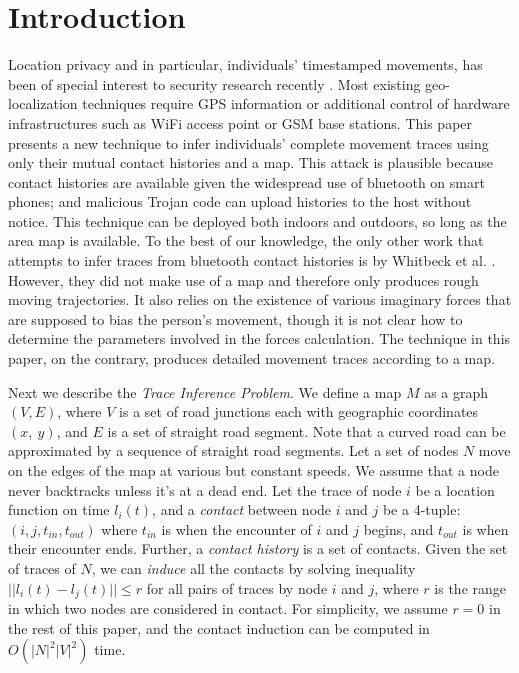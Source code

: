 \section{Introduction}
\label{sec:intro}

Location privacy and in particular, individuals' timestamped movements,
has been of special interest to security research recently
\cite{Constandache10:SeeBob,Ma10:PrivacyTraces,
Chintalapudi10:IndoorLoc,HustedM10:Malnets}.
Most existing geo-localization techniques require GPS information or additional
control of hardware infrastructures such as WiFi access point or GSM base
stations.  This paper presents a new technique
to infer individuals' complete movement traces using only their mutual
contact histories and a map. This attack is plausible
because contact histories are available given the widespread use of
bluetooth on smart phones; and malicious Trojan code can upload histories to
the host without notice. This technique can be deployed both indoors and outdoors,
so long as the area map is available.
To the best of our knowledge, the only other work that attempts to infer
traces from bluetooth contact histories is by Whitbeck et al.
\cite{Whitbeck10:Plausible}.
However, they did not make use of a map and therefore only produces rough
moving trajectories. It also relies on the existence of various imaginary
forces that are supposed to bias the person's movement, though it is not
clear how to determine the parameters involved in the
forces calculation. The technique in this paper, on the contrary, produces
detailed movement traces according to a map.

Next we describe the {\em Trace Inference Problem}.
We define a map $M$ as a graph $(V,E)$, where $V$ is a
set of road junctions each with geographic coordinates $(x,~ y)$,
and $E$ is a set of straight road segment. Note that a curved road
can be approximated by a sequence of straight road segments.
Let a set of nodes $N$ move on the edges of the map at various
but constant speeds.
We assume that a node never backtracks unless it's at a dead end.
Let the trace of node $i$ be a location function on time $l_i(t)$,
and a {\em contact} between node $i$ and $j$ be a 4-tuple:
$(i, j, t_{in}, t_{out})$
where $t_{in}$ is when the encounter of $i$ and $j$ begins, and $t_{out}$ is
when their encounter ends. Further, a {\em contact history} is a set of contacts.
Given the set of traces of $N$, we can {\em induce} all the contacts by solving
inequality $||l_i(t)-l_j(t)|| \leq r$
for all pairs of traces by node $i$ and $j$, where $r$ is the range
in which two nodes are considered in contact.
For simplicity, we assume $r = 0$ in the rest of this paper, and
the contact induction can be computed in $O(|N|^2|V|^2)$ time.

